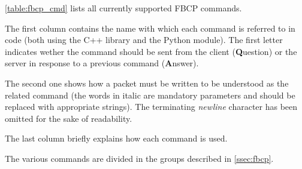 \autoref{table:fbcp_cmd} lists all currently supported FBCP commands.

The first column contains the name with which each command is referred
to in code (both using the C++ library and the Python module).
The first letter indicates wether the command should be sent from the
client (\textbf{Q}uestion) or the server in response to a previous
command (\textbf{A}nswer).

The second one shows how a packet must be written to be understood as
the related command (the words in italic are mandatory parameters and
should be replaced with appropriate strings). The terminating
\textit{newline} character has been omitted for the sake of readability.

The last column briefly explains how each command is used.

The various commands are divided in the groups described in
\autoref{ssec:fbcp}.

